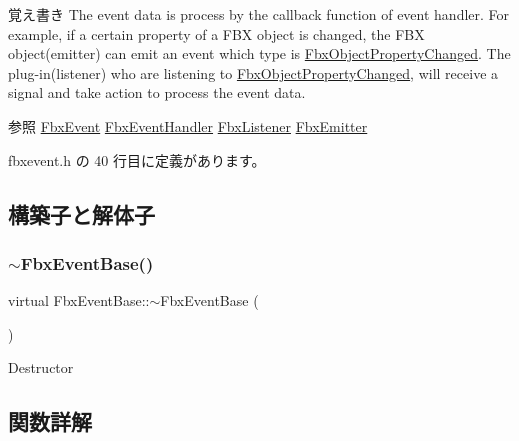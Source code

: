 \begin{DoxyNote}{覚え書き}
The event data is process by the callback function of event handler. For example, if a certain property of a F\+BX object is changed, the F\+BX object(emitter) can emit an event which type is \hyperlink{class_fbx_object_property_changed}{Fbx\+Object\+Property\+Changed}. The plug-\/in(listener) who are listening to \hyperlink{class_fbx_object_property_changed}{Fbx\+Object\+Property\+Changed}, will receive a signal and take action to process the event data.
\end{DoxyNote}
\begin{DoxySeeAlso}{参照}
\hyperlink{class_fbx_event}{Fbx\+Event} \hyperlink{class_fbx_event_handler}{Fbx\+Event\+Handler} \hyperlink{class_fbx_listener}{Fbx\+Listener} \hyperlink{class_fbx_emitter}{Fbx\+Emitter} 
\end{DoxySeeAlso}


 fbxevent.\+h の 40 行目に定義があります。



\subsection{構築子と解体子}
\mbox{\label{class_fbx_event_base_aa95657834201b514cb515cf60d371938}} 
\subsubsection{\texorpdfstring{$\sim$\+Fbx\+Event\+Base()}{~FbxEventBase()}}
{\footnotesize\ttfamily virtual Fbx\+Event\+Base\+::$\sim$\+Fbx\+Event\+Base (\begin{DoxyParamCaption}{ }\end{DoxyParamCaption})\hspace{0.3cm}{\ttfamily [virtual]}}



Destructor 



\subsection{関数詳解}
\mbox{\label{class_fbx_event_base_a94c1acf878d522042b327abf0c129f10}} 
